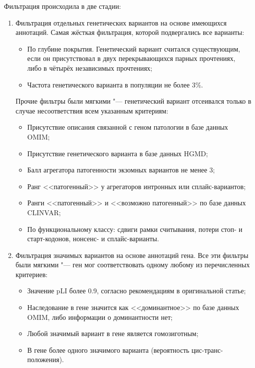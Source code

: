 \documentclass[a4paper,12pt]{article}
\begin{document}
Фильтрация происходила в две стадии:
\begin{enumerate}
\item Фильтрация отдельных генетических вариантов на основе имеющихся аннотаций.
Самая жёсткая фильтрация, которой подвергались все варианты:
\begin{itemize}
\item По глубине покрытия.
Генетический вариант считался существующим, если он присутствовал в двух перекрывающихся парных прочтениях, либо в чётырёх независимых прочтениях;
\item Частота генетического варианта в популяции не более 3\%\cite{Ryzhkova_2017}.
\end{itemize}

Прочие фильтры были мягкими "--- генетический вариант отсеивался только в случае несоответствия всем указанным критериям:

\begin{itemize}
\item Присутствие описания связанной с геном патологии в базе данных OMIM;
\item Присутствие генетического варианта в базе данных HGMD;
\item Балл агрегатора патогенности экзомных вариантов не менее 3\cite{Ryzhkova_2017};
\item Ранг <<патогенный>> у агрегаторов интронных или сплайс-вариантов;
\item Ранги <<патогенный>> и <<возможно патогенный>> по базе данных CLINVAR;
\item По функциональному классу: сдвиги рамки считывания, потери стоп- и старт-кодонов, нонсенс- и сплайс-варианты.
\end{itemize}

\item Фильтрация значимых вариантов на основе аннотаций гена.
Все эти фильтры были мягкими "--- ген мог соответствовать одному любому из перечисленных критериев:

\begin{itemize}
\item Значение pLI более 0.9, согласно рекомендациям в оригинальной статье\cite{Lek_2016};
\item Наследование в гене значится как <<доминантное>> по базе данных OMIM, либо информации о доминантности нет;
\item Любой значимый вариант в гене является гомозиготным;
\item В гене более одного значимого варианта (вероятность цис-транс-положения).
\end{itemize}
\end{enumerate}
\end{document}
